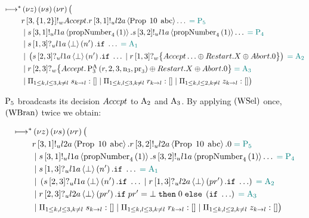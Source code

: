 \begin{align*}
\mapstostar& \NuChannels \big (\\
&
    \SendWeaklyP{\ChannelR}{3}{\Curly{1, 2}}{\Accept}.
    \SendUnreliableP{\ChannelR}{3}{1}{\LTwoA}{\ProposalC{10}{\ABC}}\ldots
    \comment{= \Proposer{5}}\\
&\Or \SendUnreliableP{\ChannelS}{3}{1}{\LOneA}{\proposalNumber{1}{4}}.\SendUnreliableP{\ChannelS}{3}{2}{\LOneA}{\proposalNumber{1}{4}}\ldots \comment{= \Proposer{4}}\\
&\Or \ReceiveUnreliableP{\ChannelS}{1}{3}{\LOneA}{\bot}{n'}.\If \ldots \comment{= \Acceptor{1}}\\
&\Or \Paren{
    \ReceiveUnreliableP{\ChannelS}{2}{3}{\LOneA}{\bot}{n'}.\If \ldots
    \Or \ReceiveWeaklyP{\ChannelR}{1}{3}{\BeginPaCont}
} \comment{= \Acceptor{2}}\\
&\Or
    \ReceiveWeaklyP{\ChannelR}{2}{3}{
        \Accept. \PaThree{\ChannelR, 2, 3, \NumberRegister_3, \ProposalRegister_3} \oplus \Restart. \RecursionVariable \oplus \Abort . \End
    }
    \comment{= \Acceptor{3}}\\
&\Or \InnerSessionQueues{\ChannelS}
\Or \InnerSessionQueues{\ChannelR}
\Or \OuterSessionQueues
\big )
\end{align*}

$\Proposer{5}$ broadcasts its decision $\Accept$ to $\Acceptor{2}$ and $\Acceptor{3}$.
By applying $\RWsel$ once, $\RWbran$ twice we obtain:

\begin{align*}
\mapstostar& \NuChannels \big (\\
&
    \SendUnreliableP{\ChannelR}{3}{1}{\LTwoA}{\ProposalC{10}{\ABC}}.
    \SendUnreliableP{\ChannelR}{3}{2}{\LTwoA}{\ProposalC{10}{\ABC}}.
    \End
    \comment{= \Proposer{5}}\\
&\Or
    \SendUnreliableP{\ChannelS}{3}{1}{\LOneA}{\proposalNumber{1}{4}}.
    \SendUnreliableP{\ChannelS}{3}{2}{\LOneA}{\proposalNumber{1}{4}}\ldots
    \comment{= \Proposer{4}}\\
&\Or \ReceiveUnreliableP{\ChannelS}{1}{3}{\LOneA}{\bot}{n'}.\If \ldots \comment{= \Acceptor{1}}\\
&\Or \Paren{
    \ReceiveUnreliableP{\ChannelS}{2}{3}{\LOneA}{\bot}{n'}.\If \ldots
    \Or \ReceiveUnreliableP{\ChannelR}{1}{3}{\LTwoA}{\bot}{pr'}.\If \ldots
} \comment{= \Acceptor{2}}\\
&\Or
    \ReceiveUnreliableP{\ChannelR}{2}{3}{\LTwoA}{\bot}{pr'}.
    \If pr' = \bot
    \;\Then \End
    \;\Else \Paren{\If \ldots}
    \comment{= \Acceptor{3}}\\
&\Or \InnerSessionQueues{\ChannelS}
\Or \InnerSessionQueues{\ChannelR}
\Or \OuterSessionQueues
\big )
\end{align*}

